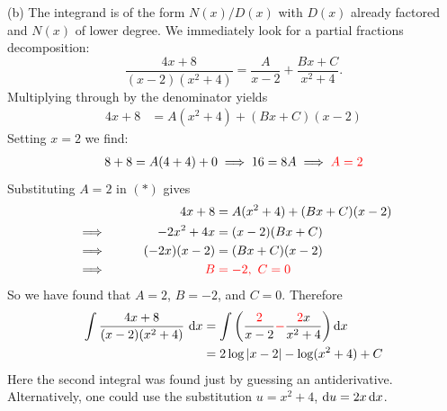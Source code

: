 \begin{solution}
\noindent (b)
The integrand is of the form $N(x)/D(x)$ with $D(x)$ already factored
and $N(x)$ of lower degree. We immediately look for a partial fractions decomposition:
\begin{equation*}
\frac{4x+8}{(x-2)(x^2+4)} = \frac{A}{x-2} + \frac{Bx+C}{x^2+4}.
\end{equation*}
Multiplying through by the denominator yields
\begin{align}
4x+8 &= A(x^2+4) + (Bx+C)(x-2)
\tag{$*$}
\end{align}
Setting $x=2$ we find:
\begin{align*}
   8 +8 = A(4 + 4) + 0 \implies 16 =8A  \implies\color{red} A = 2
\end{align*}
Substituting $A=2$ in $(*)$ gives
\begin{alignat*}{2}
&&4x+8 &= A(x^2+4) + (Bx+C)(x-2) \\
  &\implies &  -2x^2+4 x &=(x-2)(Bx + C) \\
  &\implies\qquad &  (-2x)(x-2)&=(Bx + C)(x-2) \\
  & \implies& \color{red} B& \color{red} =-2,~C=0
\end{alignat*}
So we have found that $A=2$, $B=-2$, and $C=0$. Therefore
\begin{align*}
  \int\frac{4x+8}{(x-2)(x^2+4)}\ \mathrm{d}x &= \int \bigg( \frac{\textcolor{red}2}{x-2} \textcolor{red}- \frac{\textcolor{red}2x}{x^2+4} \bigg) \,\mathrm{d}x \\
   &=  2 \log |x-2| -  \log (x^2 + 4) + C
\end{align*}
Here the second integral was found just by guessing an antiderivative.
Alternatively, one could use the substitution $u=x^2+4$,
$\mathrm{d}u=2x\,\mathrm{d}x$.


\end{solution}
